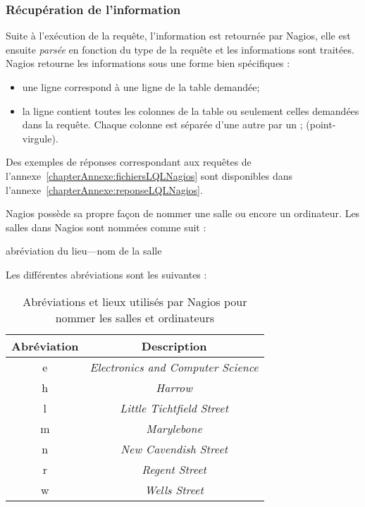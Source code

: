 \subsubsection{R\'ecup\'eration de l'information}

Suite \`a l'ex\'ecution de la requ\^ete, l'information est retourn\'ee par Nagios, elle est ensuite \textit{pars\'ee} en fonction du type de la requ\^ete et les informations sont trait\'ees.
Nagios retourne les informations sous une forme bien sp\'ecifiques : 

\begin{itemize}
	\item une ligne correspond \`a une ligne de la table demand\'ee;
	\item la ligne contient toutes les colonnes de la table ou seulement celles demand\'ees dans la requ\^ete.
	Chaque colonne est s\'epar\'ee d'une autre par un \textsf{; (point-virgule)}.

\end{itemize}

\vspace{0.20cm}

Des exemples de r\'eponses correspondant aux requ\^etes de l'annexe~\ref{chapterAnnexe:fichiersLQLNagios} sont disponibles dans l'annexe~\ref{chapterAnnexe:reponseLQLNagios}.

Nagios poss\`ede sa propre fa\c{c}on de nommer une salle ou encore un ordinateur.
\noindent Les salles dans Nagios sont nomm\'ees comme suit : 

\begin{center}
	\textsf{abr\'eviation du lieu---nom de la salle}

\end{center}

\noindent Les diff\'erentes abr\'eviations sont les suivantes :

\begin{table}[!ht]
	\centering
	\begin{tabular}{|c|c|}
		\hline
		\rowcolor{grisclair} \textbf{Abr\'eviation} & \textbf{Description}\\
		\hline
		e & \textit{Electronics and Computer Science}\\
		\hline
		h & \textit{Harrow}\\
		\hline
		l & \textit{Little Tichtfield Street}\\
		\hline
		m & \textit{Marylebone}\\
		\hline
		n & \textit{New Cavendish Street}\\
		\hline
		r & \textit{Regent Street}\\
		\hline
		w & \textit{Wells Street}\\
		\hline
	
	\end{tabular}
	
	\caption{Abr\'eviations et lieux utilis\'es par Nagios pour nommer les salles et ordinateurs}
	\label{table:abreviation}

\end{table}

